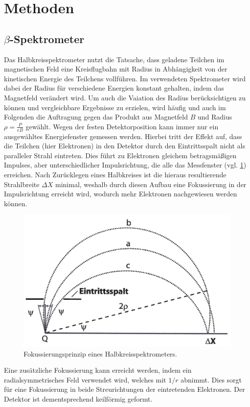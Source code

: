 \documentclass[
	a4paper,
	12pt,
	pagesize,
	ngerman
]{scrartcl}
\begin{document}
	\section{Methoden}
	\subsection{$\beta$-Spektrometer}
	Das Halbkreisspektrometer nutzt die Tatsache, dass geladene Teilchen im magnetischen Feld eine Kreisflugbahn mit Radius in Abhängigkeit von der kinetischen Energie des Teilchens vollführen.
	Im verwendeten Spektrometer wird dabei der Radius für verschiedene Energien konstant gehalten, indem das Magnetfeld verändert wird.
	Um auch die Vaiation des Radius berücksichtigen zu können und vergleichbare Ergebnisse zu erzielen, wird häufig und auch im Folgenden die Auftragung gegen das Produkt aus Magnetfeld $B$ und Radius $\rho = \frac{P}{eB}$ gewählt.
	Wegen der festen Detektorposition kann immer nur ein ausgewähltes Energiefenster gemessen werden.
	Hierbei tritt der Effekt auf, dass die Teilchen (hier Elektronen) in den Detektor durch den Eintrittsspalt nicht als paralleler Strahl eintreten.
	Dies führt zu Elektronen gleichem betragsmäßigen Impulses, aber unterschiedlicher Impulsrichtung, die alle das Messfenster (vgl. \cref{fig_Halbkreisspektrometer}) erreichen.
	Nach Zurücklegen eines Halbkreises ist die hieraus resultierende Strahlbreite $\Delta X$ minimal, weshalb durch diesen Aufbau eine Fokussierung in der Impulsrichtung erreicht wird, wodurch mehr Elektronen nachgewiesen werden können.

	\begin{figure}[H]
			\includegraphics[width= 0.6 \linewidth]{img/spektrometer_schema}
			\caption{
			Fokussierungsprinzip eines Halbkreisspektrometers.
			\cite{Anleitung}
			}
			\label{fig_Halbkreisspektrometer}
	\end{figure}

	Eine zusätzliche Fokussierung kann erreicht werden, indem ein radialsymmetrisches Feld verwendet wird, welches mit $1/r$ abnimmt.
	Dies sorgt für eine Fokussierung in beide Streurichtungen der eintretenden Elektronen.
	Der Detektor ist dementsprechend keilförmig geformt.
\end{document}
